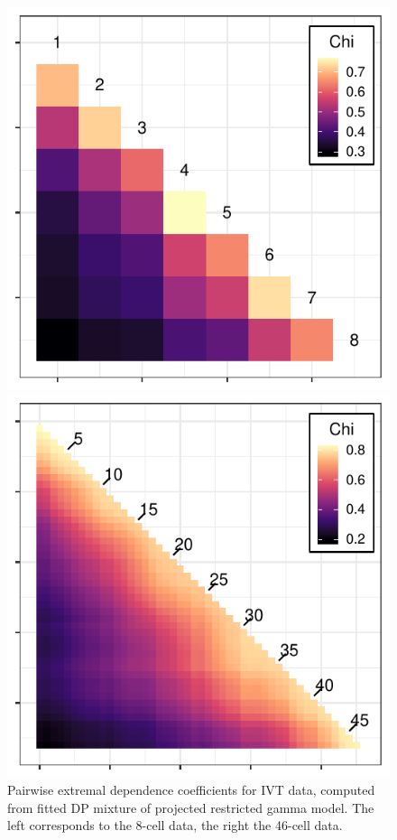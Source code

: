   \begin{figure}[ht!]
    \centering
    \label{fig:chi_ij}
    \begin{minipage}{.49\textwidth}
      \centering
      \includegraphics[width=0.99\linewidth]{./images/chi_ij_8}
    \end{minipage}
    \begin{minipage}{.49\textwidth}
      \centering
      \includegraphics[width=0.99\linewidth]{./images/chi_ij_46}
    \end{minipage}
    \caption{Pairwise extremal dependence coefficients for IVT data, computed from fitted DP mixture
      of projected restricted gamma model.  The left corresponds to the 8-cell data, the right the
      46-cell data.}
  \end{figure}

